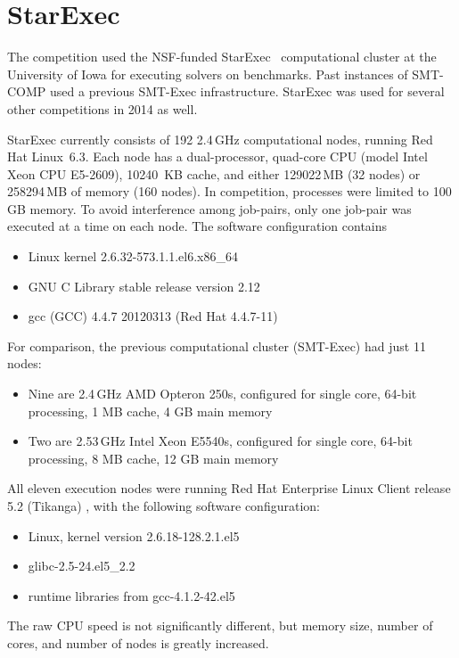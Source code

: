 \documentclass[twoside,11pt]{article}
\begin{document}
\section{StarExec}
\label{sec:starexec}

The competition used the NSF-funded StarExec~\cite{DBLP:conf/cade/StumpST14} computational cluster at the University of Iowa for executing solvers on benchmarks. Past instances of SMT-COMP used a previous SMT-Exec infrastructure. StarExec was used for several other competitions in 2014 as well.

StarExec currently consists of 192 2.4\,GHz computational nodes, running Red Hat Linux~6.3. Each node has a dual-processor, quad-core CPU (model Intel Xeon CPU E5-2609), 10240~KB cache, and either 129022\,MB (32 nodes) or 258294\,MB of memory (160 nodes). In competition, processes were limited to 100\,GB memory. To avoid interference among job-pairs, only one job-pair was executed at a time on each node. The software configuration contains
\begin{itemize}[noitemsep,nolistsep]
\item Linux kernel 2.6.32-573.1.1.el6.x86\_64
\item GNU C Library stable release version 2.12
\item gcc (GCC) 4.4.7 20120313 (Red Hat 4.4.7-11)
\end{itemize}

For comparison, the previous computational cluster (SMT-Exec) had just 11 nodes:
\begin{itemize}[noitemsep,nolistsep]
\item Nine are 2.4\,GHz AMD Opteron 250s, configured for single core, 64-bit processing, 1 MB cache, 4 GB main memory
\item Two are 2.53\,GHz Intel Xeon E5540s, configured for single core, 64-bit processing, 8 MB cache, 12 GB main memory
\end{itemize}
All eleven execution nodes were running Red Hat Enterprise Linux Client release 5.2 (Tikanga) , with the following software configuration:
\begin{itemize}[noitemsep,nolistsep]
\item Linux, kernel version 2.6.18-128.2.1.el5
\item glibc-2.5-24.el5\_2.2
\item runtime libraries from gcc-4.1.2-42.el5
\end{itemize}
The raw CPU speed is not significantly different, but memory size, number of cores, and number of nodes is greatly increased.
\end{document}

